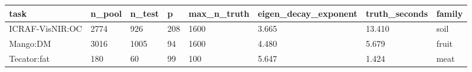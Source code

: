 \begin{tabular}{llllllll}
\hline
task & n\_pool & n\_test & p & max\_n\_truth & eigen\_decay\_exponent & truth\_seconds & family \\
\hline
ICRAF-VisNIR:OC & 2774 & 926 & 208 & 1600 & 3.665 & 13.410 & soil \\
Mango:DM & 3016 & 1005 & 94 & 1600 & 4.480 & 5.679 & fruit \\
Tecator:fat & 180 & 60 & 99 & 100 & 5.647 & 1.424 & meat \\
\hline
\end{tabular}
